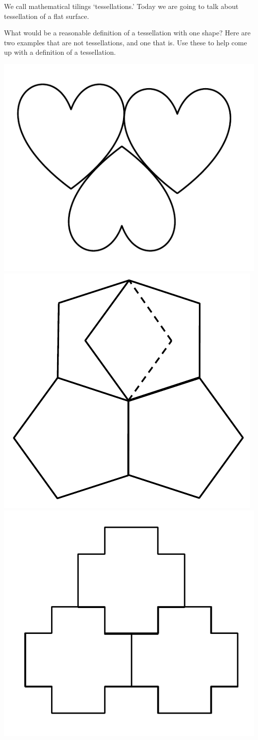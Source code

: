 \documentclass[noauthor,nooutcomes,handout,12pt]{ximera}
\begin{document}
\begin{question}
We call mathematical tilings `tessellations.' Today we are going to
talk about tessellation of a flat surface.

What would be a reasonable definition of a tessellation with one
shape? Here are two examples that are not tessellations, and one that
is. Use these to help come up with a definition of a tessellation.

\begin{center}
	\includegraphics[width=.3\textwidth]{hearts} \quad 
	\includegraphics[width=.3\textwidth]{pentagons} \quad
	\includegraphics[width=.3\textwidth]{crosses}
\end{center}

\end{question}
\mynewpage
\end{document}
